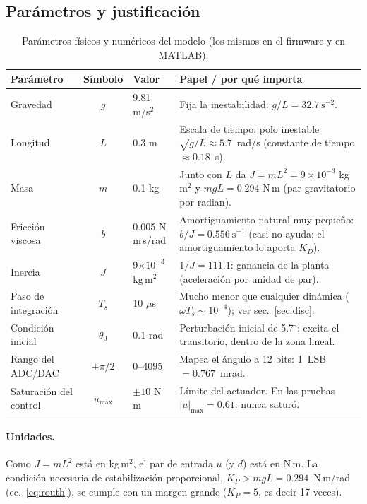 \documentclass[11pt,a4paper]{article}
\begin{document}
\subsection{Par\'ametros y justificaci\'on}
\begin{table}[H]\centering\small
\begin{tabularx}{\linewidth}{@{}l c l X@{}}
\toprule
Par\'ametro & S\'imbolo & Valor & Papel / por qu\'e importa \\ \midrule
Gravedad & $g$ & 9.81 m/s$^2$ & Fija la inestabilidad: $g/L=32.7\ \mathrm{s^{-2}}$. \\
Longitud & $L$ & 0.3 m & Escala de tiempo: polo inestable $\sqrt{g/L}\approx5.7$~rad/s (constante de tiempo $\approx0.18$~s). \\
Masa & $m$ & 0.1 kg & Junto con $L$ da $J=mL^2=9\times10^{-3}$ kg\,m$^2$ y $mgL=0.294$ N\,m (par gravitatorio por radian). \\
Fricci\'on viscosa & $b$ & 0.005 N\,m\,s/rad & Amortiguamiento natural muy peque\~no: $b/J=0.556\ \mathrm{s^{-1}}$ (casi no ayuda; el amortiguamiento lo aporta $K_D$). \\
Inercia & $J$ & 9$\times10^{-3}$ kg\,m$^2$ & $1/J=111.1$: ganancia de la planta (aceleraci\'on por unidad de par). \\
Paso de integraci\'on & $T_s$ & 10 $\mu$s & Mucho menor que cualquier din\'amica ($\omega T_s\sim10^{-4}$); ver sec.~\ref{sec:disc}. \\
Condici\'on inicial & $\theta_0$ & 0.1 rad & Perturbaci\'on inicial de 5.7$^\circ$: excita el transitorio, dentro de la zona lineal. \\
Rango del ADC/DAC & $\pm\pi/2$ & 0--4095 & Mapea el \'angulo a 12 bits: 1~LSB $=0.767$~mrad. \\
Saturaci\'on del control & $u_{\max}$ & $\pm10$ N\,m & L\'imite del actuador. En las pruebas $|u|_{\max}=0.61$: nunca satur\'o. \\ \bottomrule
\end{tabularx}
\caption{Par\'ametros f\'isicos y num\'ericos del modelo (los mismos en el firmware y en MATLAB).}
\end{table}

\paragraph{Unidades.} Como $J=mL^2$ est\'a en kg\,m$^2$, el par de entrada $u$ (y $d$) est\'a en
N\,m. La condici\'on necesaria de estabilizaci\'on proporcional,
$K_P>mgL=0.294$~N\,m/rad (ec.~\ref{eq:routh}), se cumple con un margen grande
($K_P=5$, es decir 17 veces).
\end{document}
